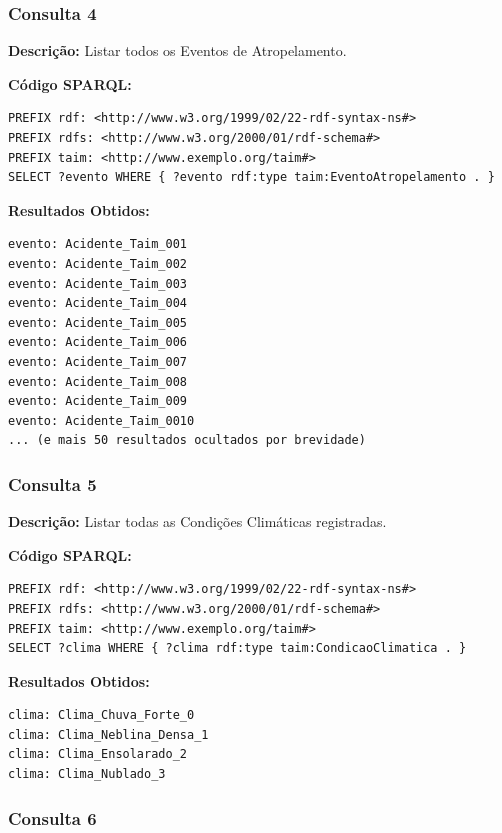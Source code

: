 \documentclass[12pt,a4paper]{article}
\begin{document}
\vspace{1cm}
\subsubsection*{Consulta 4}

\textbf{Descrição:} Listar todos os Eventos de Atropelamento.

\textbf{Código SPARQL:}
\begin{lstlisting}
PREFIX rdf: <http://www.w3.org/1999/02/22-rdf-syntax-ns#>
PREFIX rdfs: <http://www.w3.org/2000/01/rdf-schema#>
PREFIX taim: <http://www.exemplo.org/taim#>
SELECT ?evento WHERE { ?evento rdf:type taim:EventoAtropelamento . }
\end{lstlisting}

\textbf{Resultados Obtidos:}
\begin{lstlisting}
evento: Acidente_Taim_001
evento: Acidente_Taim_002
evento: Acidente_Taim_003
evento: Acidente_Taim_004
evento: Acidente_Taim_005
evento: Acidente_Taim_006
evento: Acidente_Taim_007
evento: Acidente_Taim_008
evento: Acidente_Taim_009
evento: Acidente_Taim_0010
... (e mais 50 resultados ocultados por brevidade)
\end{lstlisting}

\vspace{1cm}
\subsubsection*{Consulta 5}

\textbf{Descrição:} Listar todas as Condições Climáticas registradas.

\textbf{Código SPARQL:}
\begin{lstlisting}
PREFIX rdf: <http://www.w3.org/1999/02/22-rdf-syntax-ns#>
PREFIX rdfs: <http://www.w3.org/2000/01/rdf-schema#>
PREFIX taim: <http://www.exemplo.org/taim#>
SELECT ?clima WHERE { ?clima rdf:type taim:CondicaoClimatica . }
\end{lstlisting}

\textbf{Resultados Obtidos:}
\begin{lstlisting}
clima: Clima_Chuva_Forte_0
clima: Clima_Neblina_Densa_1
clima: Clima_Ensolarado_2
clima: Clima_Nublado_3
\end{lstlisting}

\vspace{1cm}
\subsubsection*{Consulta 6}
\end{document}
